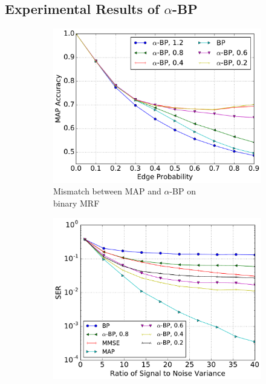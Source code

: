 \documentclass{article}
\begin{document}
\subsection{Experimental Results of $\alpha$-BP}
\begin{figure}[!h]
  \begin{subfigure}{.5\textwidth}
    \captionsetup[subfigure]{justification=centering}
    \centering
    \includegraphics[width=1\linewidth]{figures/MAPacc_edgeP_sum_crop.pdf}
    \vspace{-0.6cm}
    \caption{Mismatch between MAP and $\alpha$-BP on\\ binary MRF}
    \label{fig:mismatch}
  \end{subfigure}
  \begin{subfigure}{.5\textwidth}
    \includegraphics[width=1\linewidth]{figures/alpha_compare_crop.pdf}

\end{subfigure}
\end{figure}
\end{document}
